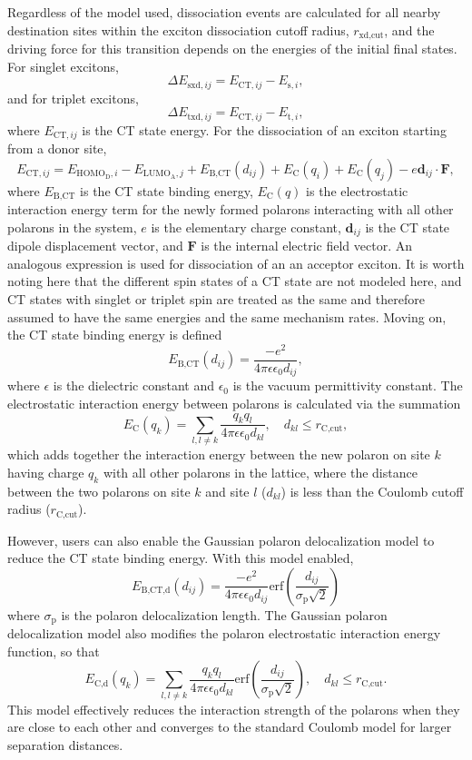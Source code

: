 \documentclass[%
 reprint,onecolumn,notitlepage,
superscriptaddress,longbibliography,
 amsmath,amssymb,
 aps,rmp,floatfix,
]{revtex4-1}
\begin{document}
Regardless of the model used, dissociation events are calculated for all nearby destination sites within the exciton dissociation cutoff radius, $r_{\text{xd,cut}}$, and the driving force for this transition depends on the energies of the initial final states. For singlet excitons,
$$\Delta E_{\text{sxd},ij} = E_{\text{CT},ij} - E_{\text{s},i},$$
and for triplet excitons,
$$\Delta E_{\text{txd},ij} = E_{\text{CT},ij} - E_{\text{t},i},$$
where $E_{\text{CT},ij}$ is the CT state energy. 
For the dissociation of an exciton starting from a donor site, 
$$E_{\text{CT},ij} = E_{\text{HOMO}_\text{D},i} - E_{\text{LUMO}_\text{A},j} + E_\text{B,CT} \left( d_{ij} \right) + E_\text{C}(q_i) + E_\text{C}(q_j) - e \mathbf{d}_{ij} \cdot \mathbf{F},$$
where $E_\text{B,CT}$ is the CT state binding energy, $E_\text{C}(q)$ is the electrostatic interaction energy term for the newly formed polarons interacting with all other polarons in the system, $e$ is the elementary charge constant, $\mathbf{d}_{ij}$ is the CT state dipole displacement vector, and $\mathbf{F}$ is the internal electric field vector.
An analogous expression is used for dissociation of an an acceptor exciton.
It is worth noting here that the different spin states of a CT state are not modeled here, and CT states with singlet or triplet spin are treated as the same and therefore assumed to have the same energies and the same mechanism rates. 
Moving on, the CT state binding energy is defined
$$E_\text{B,CT} \left( d_{ij} \right) = \frac{-e^2}{4 \pi \epsilon \epsilon_0 d_{ij}},$$
where $\epsilon$ is the dielectric constant and $\epsilon_0$ is the vacuum permittivity constant.
The electrostatic interaction energy between polarons is calculated via the summation
$$E_\text{C}(q_k) = \sum_{l,l\neq k} \frac{q_k q_l}{4 \pi \epsilon \epsilon_0 d_{kl}}, \quad d_{kl} \leq r_\text{C,cut},$$
which adds together the interaction energy between the new polaron on site $k$ having charge $q_k$ with all other polarons in the lattice, where the distance between the two polarons on site $k$ and site $l$ ($d_{kl}$) is less than the Coulomb cutoff radius ($r_\text{C,cut}$).

However, users can also enable the Gaussian polaron delocalization model\cite{gagorik2015afm} to reduce the CT state binding energy. 
With this model enabled,
$$E_\text{B,CT,d} \left( d_{ij} \right) = \frac{-e^2}{4 \pi \epsilon \epsilon_0 d_{ij}} \text{erf}\left(\frac{d_{ij}}{\sigma_\text{p}\sqrt{2}}\right)$$
where $\sigma_\text{p}$ is the polaron delocalization length.
The Gaussian polaron delocalization model also modifies the polaron electrostatic interaction energy function, so that
$$E_\text{C,d}(q_k) = \sum_{l,l\neq k} \frac{q_k q_l}{4 \pi \epsilon \epsilon_0 d_{kl}}\text{erf}\left( \frac{d_{ij}}{\sigma_\text{p}\sqrt{2}}\right), \quad d_{kl} \leq r_\text{C,cut}.$$
This model effectively reduces the interaction strength of the polarons when they are close to each other and converges to the standard Coulomb model for larger separation distances. 
\end{document}
